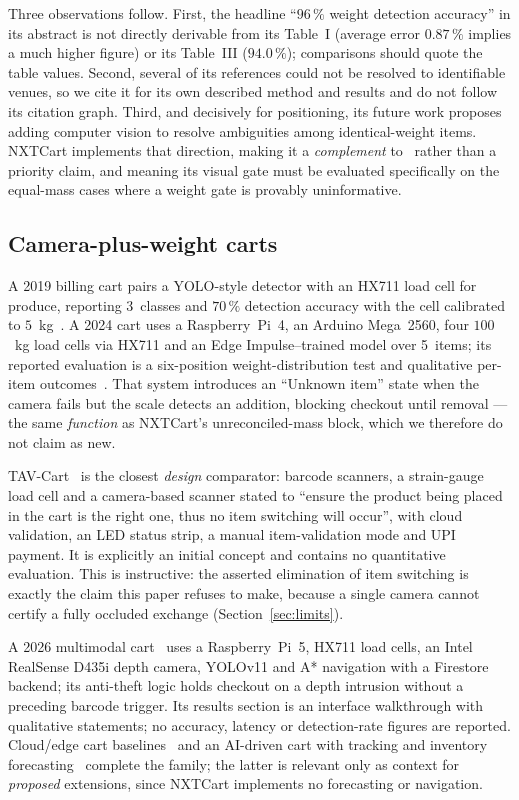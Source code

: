 \documentclass[conference]{IEEEtran}
\begin{document}
Three observations follow. First, the headline ``$96\,\%$ weight detection accuracy'' in its abstract
is not directly derivable from its Table~I (average error $0.87\,\%$ implies a much higher figure) or
its Table~III ($94.0\,\%$); comparisons should quote the table values. Second, several of its
references could not be resolved to identifiable venues, so we cite it for its own described method
and results and do not follow its citation graph. Third, and decisively for positioning, its future
work proposes adding computer vision to resolve ambiguities among identical-weight items. NXTCart
implements that direction, making it a \emph{complement} to~\cite{R02} rather than a priority claim,
and meaning its visual gate must be evaluated specifically on the equal-mass cases where a weight
gate is provably uninformative.

\subsection{Camera-plus-weight carts}
A 2019 billing cart pairs a YOLO-style detector with an HX711 load cell for produce, reporting
3~classes and $70\,\%$ detection accuracy with the cell calibrated to $5$~kg~\cite{R04}. A 2024 cart
uses a Raspberry~Pi~4, an Arduino Mega~2560, four $100$~kg load cells via HX711 and an Edge
Impulse--trained model over 5~items; its reported evaluation is a six-position weight-distribution
test and qualitative per-item outcomes~\cite{R05}. That system introduces an ``Unknown item'' state
when the camera fails but the scale detects an addition, blocking checkout until removal --- the same
\emph{function} as NXTCart's unreconciled-mass block, which we therefore do not claim as new.

TAV-Cart~\cite{R03} is the closest \emph{design} comparator: barcode scanners, a strain-gauge load
cell and a camera-based scanner stated to ``ensure the product being placed in the cart is the right
one, thus no item switching will occur'', with cloud validation, an LED status strip, a manual
item-validation mode and UPI payment. It is explicitly an initial concept and contains no quantitative
evaluation. This is instructive: the asserted elimination of item switching is exactly the claim this
paper refuses to make, because a single camera cannot certify a fully occluded exchange
(Section~\ref{sec:limits}).

A 2026 multimodal cart~\cite{R26} uses a Raspberry~Pi~5, HX711 load cells, an Intel RealSense D435i
depth camera, YOLOv11 and A* navigation with a Firestore backend; its anti-theft logic holds checkout
on a depth intrusion without a preceding barcode trigger. Its results section is an interface
walkthrough with qualitative statements; no accuracy, latency or detection-rate figures are reported.
Cloud/edge cart baselines~\cite{R09,R24} and an AI-driven cart with tracking and inventory
forecasting~\cite{R21} complete the family; the latter is relevant only as context for \emph{proposed}
extensions, since NXTCart implements no forecasting or navigation.
\end{document}
